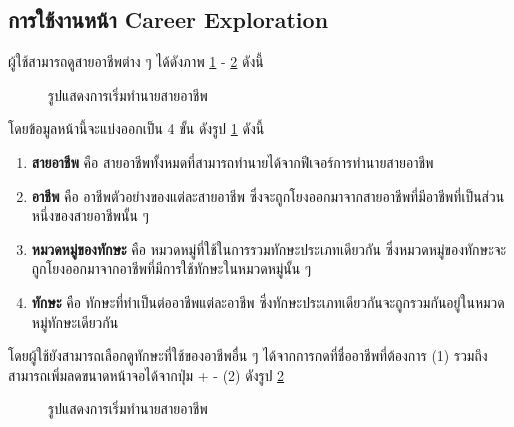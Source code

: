 \subsection{การใช้งานหน้า Career Exploration}
ผู้ใช้สามารถดูสายอาชีพต่าง ๆ ได้ดังภาพ \ref{fig:info-CE} - \ref{fig:home-CE} ดังนี้
\begin{figure}[H]\centering
    \caption{รูปแสดงการเริ่มทำนายสายอาชีพ}\label{fig:info-CE}
\end{figure}
โดยข้อมูลหน้านี้จะแบ่งออกเป็น 4 ขั้น ดังรูป \ref{fig:info-CE} ดังนี้
\begin{enumerate}
    \item \textbf{สายอาชีพ} คือ สายอาชีพทั้งหมดที่สามารถทำนายได้จากฟีเจอร์การทำนายสายอาชีพ
    \item \textbf{อาชีพ} คือ อาชีพตัวอย่างของแต่ละสายอาชีพ ซึ่งจะถูกโยงออกมาจากสายอาชีพที่มีอาชีพที่เป็นส่วนหนึ่งของสายอาชีพนั้น ๆ
    \item \textbf{หมวดหมู่ของทักษะ} คือ หมวดหมู่ที่ใช้ในการรวมทักษะประเภทเดียวกัน ซึ่งหมวดหมู่ของทักษะจะถูกโยงออกมาจากอาชีพที่มีการใช้ทักษะในหมวดหมู่นั้น ๆ 
    \item \textbf{ทักษะ} คือ ทักษะที่ทำเป็นต่ออาชีพแต่ละอาชีพ ซึ่งทักษะประเภทเดียวกันจะถูกรวมกันอยู่ในหมวดหมู่ทักษะเดียวกัน
\end{enumerate}

โดยผู้ใช้ยังสามารถเลือกดูทักษะที่ใช้ของอาชีพอื่น ๆ ได้จากการกดที่ชื่ออาชีพที่ต้องการ (1) รวมถึงสามารถเพิ่มลดขนาดหน้าจอได้จากปุ่ม + - (2) ดังรูป \ref{fig:home-CE}
\begin{figure}[H]\centering
    \caption{รูปแสดงการเริ่มทำนายสายอาชีพ}\label{fig:home-CE}
\end{figure}